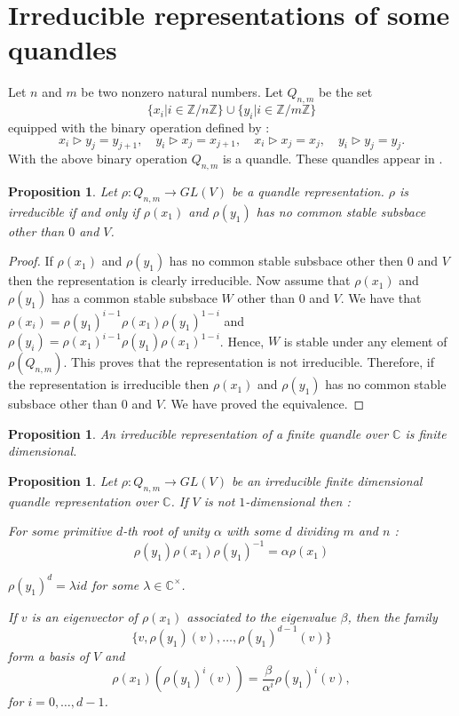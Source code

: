 \documentclass[12pt, reqno]{amsart}
\newtheorem{proposition}[theorem]{Proposition}
\begin{document}
\section{Irreducible representations of some quandles}
Let $n$ and $m$ be two nonzero natural numbers. Let $Q_{n,m}$ be the set $$\{x_i \vert i \in \mathbb{Z}/n\mathbb{Z} \} \cup \{y_i \vert i \in \mathbb{Z}/m\mathbb{Z} \}$$ equipped with the binary operation defined by :
$$x_i \triangleright y_j=y_{j+1},\quad y_i\triangleright x_j=x_{j+1} ,\quad x_{i}\triangleright x_j=x_j,\quad y_i\triangleright y_j=y_j.$$
With the above binary operation $Q_{n,m}$ is a quandle. These quandles appear in \cite{EM}. 

\begin{proposition}\label{ir}
Let $\rho : Q_{n,m} \to GL(V)$ be a quandle representation. $\rho$ is irreducible if and only if $\rho(x_1)$ and $\rho(y_1)$ has no common stable subsbace other than $0$ and $V$.
\end{proposition}
\begin{proof}
If $\rho(x_1)$ and $\rho(y_1)$ has no common stable subsbace other then $0$ and $V$ then the representation is clearly irreducible. Now assume that $\rho(x_1)$ and $\rho(y_1)$ has a common stable subsbace $W$ other than $0$ and $V$. We have that $\rho(x_i)=\rho(y_1)^{i-1}\rho(x_1)\rho(y_1)^{1-i}$ and $\rho(y_i)=\rho(x_1)^{i-1}\rho(y_1)\rho(x_1)^{1-i}$. Hence, $W$ is stable under any element of $\rho(Q_{n,m})$. This proves that the representation is not irreducible. Therefore, if the representation is irreducible then $\rho(x_1)$ and $\rho(y_1)$ has no common stable subsbace other than $0$ and $V$. We have proved the equivalence.
\end{proof}
\begin{proposition}\cite{GQ}
An irreducible representation of a finite quandle over $\mathbb{C}$ is finite dimensional.
\end{proposition}
\begin{proposition}\label{ir2}
Let $\rho :Q_{n,m} \to GL(V)$ be an irreducible finite dimensional quandle representation over $\mathbb{C}$. If $V$ is not $1$-dimensional then :
\item[1)]  For some primitive $d$-th root of unity $\alpha$ with some $d$ dividing $m$ and $n$ :
$$\rho(y_1)\rho(x_1)\rho(y_1)^{-1}=\alpha \rho(x_1)$$
\item[2)] $\rho(y_1)^d=\lambda id$ for some $\lambda \in \mathbb{C}^\times$.
\item[3)] If $v$ is an eigenvector of $\rho(x_1)$ associated to the eigenvalue $\beta$, then the family 
$$\{v,\rho(y_1)(v),\dots,\rho(y_1)^{d-1}(v)\}$$ form a basis of $V$ and $$\rho(x_1)(\rho(y_1)^i(v))=\frac{\beta}{\alpha^i}\rho(y_1)^i(v),$$
for $i=0,\dots,d-1$. 
\end{proposition}
\end{document}
